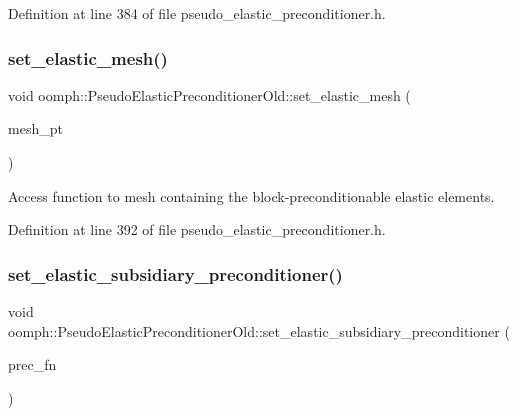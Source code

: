 Definition at line 384 of file pseudo\+\_\+elastic\+\_\+preconditioner.\+h.

\mbox{\label{classoomph_1_1PseudoElasticPreconditionerOld_a96464001afad81606a6d298f4045de70}} 
\subsubsection{\texorpdfstring{set\+\_\+elastic\+\_\+mesh()}{set\_elastic\_mesh()}}
{\footnotesize\ttfamily void oomph\+::\+Pseudo\+Elastic\+Preconditioner\+Old\+::set\+\_\+elastic\+\_\+mesh (\begin{DoxyParamCaption}\item[{Mesh $\ast$}]{mesh\+\_\+pt }\end{DoxyParamCaption})\hspace{0.3cm}{\ttfamily [inline]}}



Access function to mesh containing the block-\/preconditionable elastic elements. 



Definition at line 392 of file pseudo\+\_\+elastic\+\_\+preconditioner.\+h.

\mbox{\label{classoomph_1_1PseudoElasticPreconditionerOld_aae1c5f984fee69fca7cd9719ed2222a4}} 
\subsubsection{\texorpdfstring{set\+\_\+elastic\+\_\+subsidiary\+\_\+preconditioner()}{set\_elastic\_subsidiary\_preconditioner()}}
{\footnotesize\ttfamily void oomph\+::\+Pseudo\+Elastic\+Preconditioner\+Old\+::set\+\_\+elastic\+\_\+subsidiary\+\_\+preconditioner (\begin{DoxyParamCaption}\item[{\hyperlink{classoomph_1_1PseudoElasticPreconditionerOld_a8ee80a4a55139190a6e2a16fa175e75f}{Subsidiary\+Preconditioner\+Fct\+Pt}}]{prec\+\_\+fn }\end{DoxyParamCaption})\hspace{0.3cm}{\ttfamily [inline]}}



